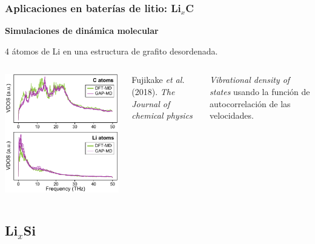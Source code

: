 \documentclass[aspectratio=169]{beamer}
\let\oldtextbf\textbf
\renewcommand{\textbf}[1]{\textcolor{nordblue}{\oldtextbf{#1}}}
\begin{document}
    \begin{frame}
        \frametitle{Aplicaciones en baterías de litio: Li$_x$C}

        \textbf{Simulaciones de dinámica molecular}

        4 átomos de Li en una estructura de grafito desordenada.
        
        \begin{columns}
            \begin{center}
                \includegraphics[width=\columnwidth]{LiC-VDOS.png}
            \end{center}
            \tiny{Fujikake \textit{et al.} (2018). \textit{The Journal of chemical
            physics}}
            
            \textit{Vibrational density of states} usando la función de 
            autocorrelación de las velocidades.
        \end{columns}
    \end{frame}

    \subsection{Li$_x$Si}
\end{document}
